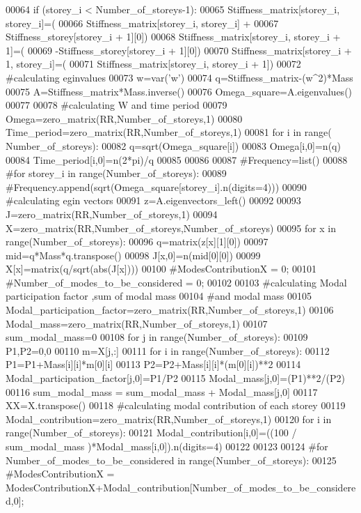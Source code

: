 \begin{DoxyCode}
00064    if (storey\_i < Number\_of\_storeys-1):
00065        Stiffness\_matrix[storey\_i, storey\_i]=(
00066            Stiffness\_matrix[storey\_i, storey\_i] +
00067            Stiffness\_storey[storey\_i + 1][0])
00068        Stiffness\_matrix[storey\_i, storey\_i + 1]=(
00069        -Stiffness\_storey[storey\_i + 1][0])
00070        Stiffness\_matrix[storey\_i + 1, storey\_i]=(
00071        Stiffness\_matrix[storey\_i, storey\_i + 1])
00072 #calculating eginvalues
00073 w=var('w')
00074 q=Stiffness\_matrix-(w^2)*Mass
00075 A=Stiffness\_matrix*Mass.inverse()
00076 Omega\_square=A.eigenvalues()
00077 
00078 #calculating W and time period
00079 Omega=zero\_matrix(RR,Number\_of\_storeys,1)
00080 Time\_period=zero\_matrix(RR,Number\_of\_storeys,1)
00081 for i in range( Number\_of\_storeys):
00082    q=sqrt(Omega\_square[i])
00083    Omega[i,0]=n(q)
00084    Time\_period[i,0]=n(2*pi)/q
00085 
00086 
00087 #Frequency=list()
00088 #for storey\_i in range(Number\_of\_storeys):
00089    #Frequency.append(sqrt(Omega\_square[storey\_i].n(digits=4)))
00090 #calculating egin vectors
00091 z=A.eigenvectors\_left()
00092 
00093 J=zero\_matrix(RR,Number\_of\_storeys,1)
00094 X=zero\_matrix(RR,Number\_of\_storeys,Number\_of\_storeys)
00095 for x in range(Number\_of\_storeys):
00096    q=matrix(z[x][1][0])
00097    mid=q*Mass*q.transpose()
00098    J[x,0]=n(mid[0][0])
00099    X[x]=matrix(q/sqrt(abs(J[x])))
00100 #ModesContributionX = 0;
00101 #Number\_of\_modes\_to\_be\_considered = 0;
00102 
00103 #calculating Modal participation factor ,sum of modal mass
00104 #and modal mass
00105 Modal\_participation\_factor=zero\_matrix(RR,Number\_of\_storeys,1)
00106 Modal\_mass=zero\_matrix(RR,Number\_of\_storeys,1)
00107 sum\_modal\_mass=0
00108 for j in range(Number\_of\_storeys):
00109         P1,P2=0,0
00110         m=X[j,:]
00111         for i in range(Number\_of\_storeys):
00112             P1=P1+Mass[i][i]*m[0][i]
00113             P2=P2+Mass[i][i]*(m[0][i])**2
00114         Modal\_participation\_factor[j,0]=P1/P2
00115         Modal\_mass[j,0]=(P1)**2/(P2)
00116         sum\_modal\_mass = sum\_modal\_mass + Modal\_mass[j,0]
00117 XX=X.transpose()
00118 #calculating modal contribution of each storey
00119 Modal\_contribution=zero\_matrix(RR,Number\_of\_storeys,1)
00120 for i in range(Number\_of\_storeys):
00121    Modal\_contribution[i,0]=((100 / sum\_modal\_mass )*Modal\_mass[i,0]).n(digits=4)
00122 
00123 
00124 #for Number\_of\_modes\_to\_be\_considered in range(Number\_of\_storeys):
00125    #ModesContributionX = ModesContributionX+Modal\_contribution[Number\_of\_modes\_to\_be\_considered,0];

\end{DoxyCode}
